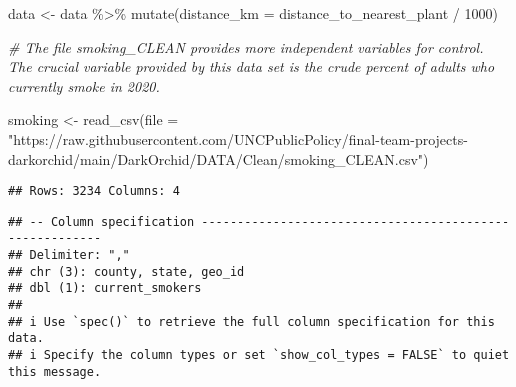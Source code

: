 \documentclass[
]{article}
\newenvironment{Shaded}{\begin{snugshade}}{\end{snugshade}}
\newcommand{\AttributeTok}[1]{\textcolor[rgb]{0.77,0.63,0.00}{#1}}
\newcommand{\CommentTok}[1]{\textcolor[rgb]{0.56,0.35,0.01}{\textit{#1}}}
\newcommand{\DecValTok}[1]{\textcolor[rgb]{0.00,0.00,0.81}{#1}}
\newcommand{\FunctionTok}[1]{\textcolor[rgb]{0.00,0.00,0.00}{#1}}
\newcommand{\NormalTok}[1]{#1}
\newcommand{\OtherTok}[1]{\textcolor[rgb]{0.56,0.35,0.01}{#1}}
\newcommand{\SpecialCharTok}[1]{\textcolor[rgb]{0.00,0.00,0.00}{#1}}
\newcommand{\StringTok}[1]{\textcolor[rgb]{0.31,0.60,0.02}{#1}}
\begin{document}
\begin{Shaded}
\begin{Highlighting}[]
\NormalTok{data }\OtherTok{\textless{}{-}}\NormalTok{ data }\SpecialCharTok{\%\textgreater{}\%} 
  \FunctionTok{mutate}\NormalTok{(}\AttributeTok{distance\_km =}\NormalTok{ distance\_to\_nearest\_plant }\SpecialCharTok{/} \DecValTok{1000}\NormalTok{)}

\CommentTok{\# The file smoking\_CLEAN provides more independent variables for control. The crucial variable provided by this data set is the crude percent of adults who currently smoke in 2020.}

\NormalTok{smoking }\OtherTok{\textless{}{-}} \FunctionTok{read\_csv}\NormalTok{(}\AttributeTok{file =} \StringTok{"https://raw.githubusercontent.com/UNCPublicPolicy/final{-}team{-}projects{-}darkorchid/main/DarkOrchid/DATA/Clean/smoking\_CLEAN.csv"}\NormalTok{)}
\end{Highlighting}
\end{Shaded}

\begin{verbatim}
## Rows: 3234 Columns: 4
\end{verbatim}

\begin{verbatim}
## -- Column specification --------------------------------------------------------
## Delimiter: ","
## chr (3): county, state, geo_id
## dbl (1): current_smokers
## 
## i Use `spec()` to retrieve the full column specification for this data.
## i Specify the column types or set `show_col_types = FALSE` to quiet this message.
\end{verbatim}
\end{document}
